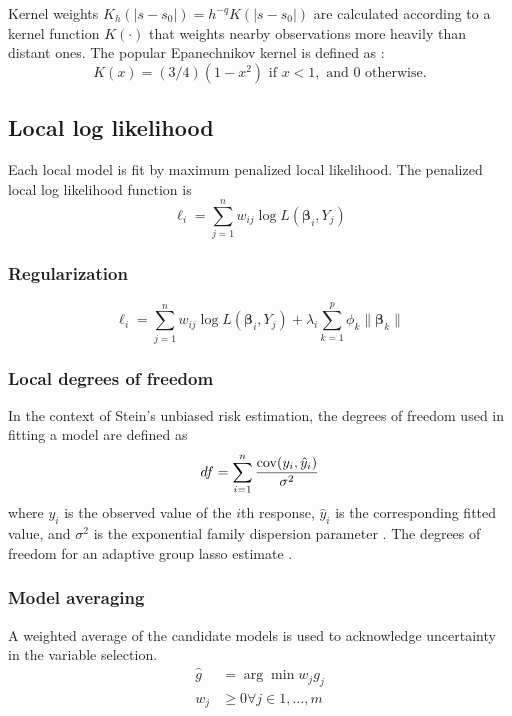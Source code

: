 Kernel weights $K_h(|s-s_0|) = h^{-q} K(|s-s_0|)$ are calculated according to a kernel function $K(\cdot)$ that weights nearby observations more heavily than distant ones. The popular Epanechnikov kernel is defined as \citep{Samiuddin-el-Sayyad-1990}:
\begin{equation}
K(x) = (3/4) (1-x^2) \text{ if } x<1, \text{ and } 0 \text{ otherwise}.
\end{equation}

\subsection{Local log likelihood}
Each local model is fit by maximum penalized local likelihood. The penalized local log likelihood function is
\begin{equation}
\ell_i = \sum_{j=1}^n w_{ij} \log{L(\bm{\beta}_i, Y_j)} 
\end{equation}

\subsubsection{Regularization}
\begin{equation}
\ell_i = \sum_{j=1}^n w_{ij} \log{L(\bm{\beta}_i, Y_j)} + \lambda_i \sum_{k=1}^p \phi_k \| \bm{\beta}_k \|
\end{equation}


\subsubsection{Local degrees of freedom}
In the context of Stein's unbiased risk estimation, the degrees of freedom used in fitting a model are defined as 
\begin{equation}
df = \sum_{i=1}^n \frac{{\rm cov}(y_i, \hat{y}_i)}{\sigma^2}
\end{equation}
where $y_i$ is the observed value of the $i$th response, $\hat{y}_i$ is the corresponding fitted value, and $\sigma^2$ is the exponential family dispersion parameter \citep{Efron-1986}. The degrees of freedom for an adaptive group lasso estimate \citep{Vaiter-Deledalle-Peyre-Fadili-Dossal-2012}.

\subsubsection{Model averaging}
A weighted average of the candidate models is used to acknowledge uncertainty in the variable selection. 
\begin{align}
\hat{g} &= \arg\!\min w_j g_j \\
w_j &\geq 0 \forall j \in 1, \dots, m
\end{align}

